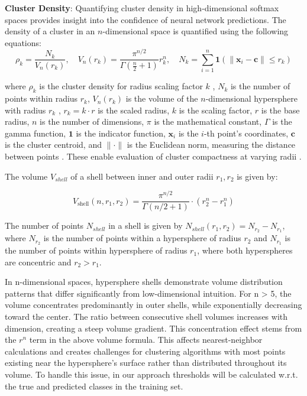 \textbf{Cluster Density}: Quantifying cluster density in high-dimensional softmax spaces provides insight into the confidence of neural network predictions. The density of a cluster in an $n$-dimensional space is quantified using the following equations:
\begin{equation}
\rho_k = \frac{N_k}{V_n(r_k)}, \quad V_n(r_k) = \frac{\pi^{n/2}}{\Gamma\left(\frac{n}{2} + 1\right)} r_k^n, \quad N_k = \sum_{i=1}^n \mathbf{1}(\|\mathbf{x}_i - \mathbf{c}\| \leq r_k) \label{eq:density_volume_count}
\end{equation}

\noindent where \(\rho_k\) is the cluster density for radius scaling factor \(k\) \cite{ester1996density}, \(N_k\) is the number of points within radius \(r_k\), \(V_n(r_k)\) is the volume of the \(n\)-dimensional hypersphere with radius \(r_k\) \cite{Conway1998}, \(r_k = k \cdot r\) is the scaled radius, \(k\) is the scaling factor, \(r\) is the base radius, \(n\) is the number of dimensions, \(\pi\) is the mathematical constant, \(\Gamma\) is the gamma function, \(\mathbf{1}\) is the indicator function, \(\mathbf{x}_i\) is the \(i\)-th point’s coordinates, \(\mathbf{c}\) is the cluster centroid, and \(\|\cdot\|\) is the Euclidean norm, measuring the distance between points \cite{Duda2000}. These enable evaluation of cluster compactness at varying radii \cite{Hastie2009}.

The volume $V_{shell}$ of a shell between inner and outer radii $r_1, r_2$  is given by:

\begin{equation}
V_{\text{shell}}(n, r_1, r_2) = \frac{\pi^{n/2}}{\Gamma(n/2 + 1)} \cdot \left( r_2^n - r_1^n \right)
\end{equation}

The number of points $N_{shell}$ in a shell is given by $ N_{shell}(r_1,r_2) = N_{r_2} - N_{r_1} $, where $N_{r_2}$ is the number of points within a hypersphere of radius $r_2$ and $N_{r_1}$ is the number of points within hypersphere of radius $r_1$, where both hyperspheres are concentric and $r_2 > r_1$.

In n-dimensional spaces, hypersphere shells demonstrate volume distribution patterns that differ significantly from low-dimensional intuition. For n > 5, the volume concentrates predominantly in outer shells, while exponentially decreasing toward the center. The ratio between consecutive shell volumes increases with dimension, creating a steep volume gradient. This concentration effect stems from the $r^n$ term in the above volume formula. This affects nearest-neighbor calculations and creates challenges for clustering algorithms with most points existing near the hypersphere's surface rather than distributed throughout its volume. To handle this issue, in our approach thresholds will be calculated w.r.t. the true and predicted classes in the training set.

